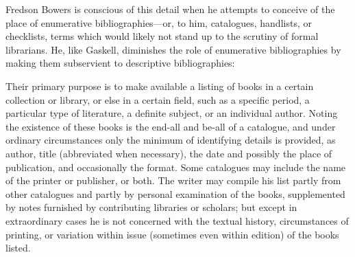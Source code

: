 Fredson Bowers is conscious of this detail when he attempts to conceive of the place of enumerative bibliographies---or, to him, catalogues, handlists, or checklists, terms which would likely not stand up to the scrutiny of formal librarians. He, like Gaskell, diminishes the role of enumerative bibliographies by making them subservient to descriptive bibliographies: \begin{displayquote}
Their primary purpose is to make available a listing of books in a certain collection or library, or else in a certain field, such as a specific period, a particular type of literature, a definite subject, or an individual author. Noting the existence of these books is the end-all and be-all of a catalogue, and under ordinary circumstances only the minimum of identifying details is provided, as author, title (abbreviated when necessary), the date and possibly the place of publication, and occasionally the format. Some catalogues may include the name of the printer or publisher, or both. The writer may compile his list partly from other catalogues and partly by personal examination of the books, supplemented by notes furnished by contributing libraries or scholars; but except in extraordinary cases he is not concerned with the textual history, circumstances of printing, or variation within issue (sometimes even within edition) of the books listed.\autocite[3]{bowers_principles_2005}
\end{displayquote}
